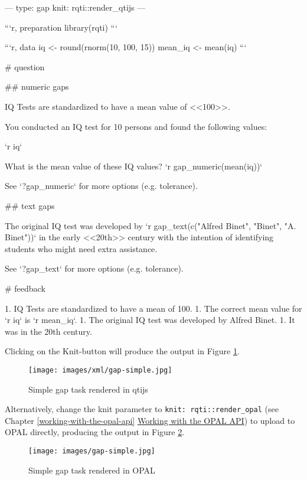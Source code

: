 \documentclass[twoside]{tufte-book}
\newenvironment{Shaded}{}{}
\begin{document}
\begin{Shaded}
\begin{Highlighting}
---
type: gap
knit: rqti::render_qtijs
---

```{r, preparation}
library(rqti)
```

```{r, data}
iq <- round(rnorm(10, 100, 15))
mean_iq <- mean(iq)
```

# question

## numeric gaps

IQ Tests are standardized to have a mean value of <<100>>.

You conducted an IQ test for 10 persons and found the following values:

`r iq`

What is the mean value of these IQ values? `r gap_numeric(mean(iq))`

See `?gap_numeric` for more options (e.g. tolerance).

## text gaps

The original IQ test was developed by `r gap_text(c("Alfred Binet", "Binet", "A.
Binet"))` in the early <<20th>> century with the intention of identifying
students who might need extra assistance.

See `?gap_text` for more options (e.g. tolerance).

# feedback

1. IQ Tests are standardized to have a mean of 100.
1. The correct mean value for `r iq` is `r mean_iq`.
1. The original IQ test was developed by Alfred Binet.
1. It was in the 20th century.
\end{Highlighting}
\end{Shaded}

Clicking on the Knit-button will produce the output in Figure \ref{gap1qtijs}.

\begin{figure}
\centering
\texttt{[image: images/xml/gap-simple.jpg]}
\caption{\label{gap1qtijs}Simple gap task rendered in qtijs}
\end{figure}

\noindent \noindent Alternatively, change the knit parameter to \texttt{knit:\ rqti::render\_opal} (see Chapter \ref{working-with-the-opal-api} \href{api_opal.html}{Working with the OPAL API}) to upload to OPAL directly, producing the output in Figure \ref{gap1opal}.

\begin{figure}
\centering
\texttt{[image: images/gap-simple.jpg]}
\caption{\label{gap1opal}Simple gap task rendered in OPAL}
\end{figure}
\end{document}
